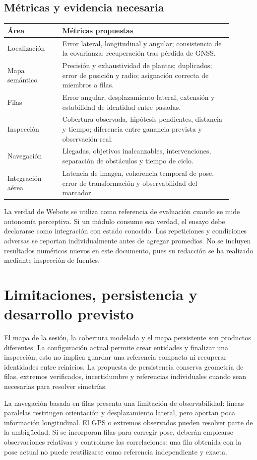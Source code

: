 \subsection{Métricas y evidencia necesaria}
\begin{longtable}{p{0.22\linewidth}p{0.68\linewidth}}
\toprule Área & Métricas propuestas \\\midrule
Localización & Error lateral, longitudinal y angular; consistencia de la covarianza; recuperación tras pérdida de GNSS. \\
Mapa semántico & Precisión y exhaustividad de plantas; duplicados; error de posición y radio; asignación correcta de miembros a filas. \\
Filas & Error angular, desplazamiento lateral, extensión y estabilidad de identidad entre pasadas. \\
Inspección & Cobertura observada, hipótesis pendientes, distancia y tiempo; diferencia entre ganancia prevista y observación real. \\
Navegación & Llegadas, objetivos inalcanzables, intervenciones, separación de obstáculos y tiempo de ciclo. \\
Integración aérea & Latencia de imagen, coherencia temporal de pose, error de transformación y observabilidad del marcador. \\
\bottomrule
\end{longtable}
La verdad de Webots se utiliza como referencia de evaluación cuando se mide autonomía perceptiva. Si un módulo consume esa verdad, el ensayo debe declararse como integración con estado conocido. Las repeticiones y condiciones adversas se reportan individualmente antes de agregar promedios. No se incluyen resultados numéricos nuevos en este documento, pues su redacción se ha realizado mediante inspección de fuentes.

\section{Limitaciones, persistencia y desarrollo previsto}
El mapa de la sesión, la cobertura modelada y el mapa persistente son productos diferentes. La configuración actual permite crear entidades y finalizar una inspección; esto no implica guardar una referencia compacta ni recuperar identidades entre reinicios. La propuesta de persistencia conserva geometría de filas, extremos verificados, incertidumbre y referencias individuales cuando sean necesarias para resolver simetrías.

La navegación basada en filas presenta una limitación de observabilidad: líneas paralelas restringen orientación y desplazamiento lateral, pero aportan poca información longitudinal. El GPS o extremos observados pueden resolver parte de la ambigüedad. Si se incorporan filas para corregir pose, deberán emplearse observaciones relativas y controlarse las correlaciones: una fila obtenida con la pose actual no puede reutilizarse como referencia independiente y exacta.

